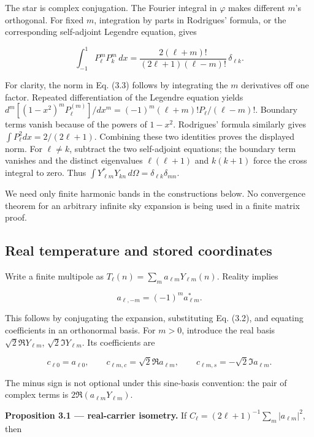 \documentclass[
  11pt,
  a4paper]{article}
\begin{document}
The star is complex conjugation. The Fourier integral in \(\varphi\) makes different \(m\)'s orthogonal. For fixed \(m\), integration by parts in Rodrigues' formula, or the corresponding self-adjoint Legendre equation, gives

\[
\int_{-1}^1P_\ell^mP_k^m\,dx
=\frac{2(\ell+m)!}{(2\ell+1)(\ell-m)!}\,\delta_{\ell k}.
\tag{3.3}
\]

For clarity, the norm in Eq. (3.3) follows by integrating the \(m\) derivatives off one factor. Repeated differentiation of the Legendre equation yields
\(d^m[(1-x^2)^mP_\ell^{(m)}]/dx^m=(-1)^m(\ell+m)!P_\ell/(\ell-m)!\). Boundary terms vanish because of the powers of \(1-x^2\). Rodrigues' formula similarly gives \(\int P_\ell^2dx=2/(2\ell+1)\). Combining these two identities proves the displayed norm. For \(\ell\ne k\), subtract the two self-adjoint equations; the boundary term vanishes and the distinct eigenvalues \(\ell(\ell+1)\) and \(k(k+1)\) force the cross integral to zero. Thus \(\int Y_{\ell m}^*Y_{kn}\,d\Omega=\delta_{\ell k}\delta_{mn}\).

We need only finite harmonic bands in the constructions below. No convergence theorem for an arbitrary infinite sky expansion is being used in a finite matrix proof.

\hypertarget{real-temperature-and-stored-coordinates}{%
\subsection{Real temperature and stored coordinates}\label{real-temperature-and-stored-coordinates}}

Write a finite multipole as \(T_\ell(n)=\sum_m a_{\ell m}Y_{\ell m}(n)\). Reality implies

\[
a_{\ell,-m}=(-1)^m a_{\ell m}^*.
\tag{3.4}
\]

This follows by conjugating the expansion, substituting Eq. (3.2), and equating coefficients in an orthonormal basis. For \(m>0\), introduce the real basis \(\sqrt2\Re Y_{\ell m}\), \(\sqrt2\Im Y_{\ell m}\). Its coefficients are

\[
c_{\ell0}=a_{\ell0},\qquad
c_{\ell m,c}=\sqrt2\Re a_{\ell m},\qquad
c_{\ell m,s}=-\sqrt2\Im a_{\ell m}.
\tag{3.5}
\]

The minus sign is not optional under this sine-basis convention: the pair of complex terms is \(2\Re(a_{\ell m}Y_{\ell m})\).

\textbf{Proposition 3.1 --- real-carrier isometry.} If
\(C_\ell=(2\ell+1)^{-1}\sum_m|a_{\ell m}|^2\), then
\end{document}
